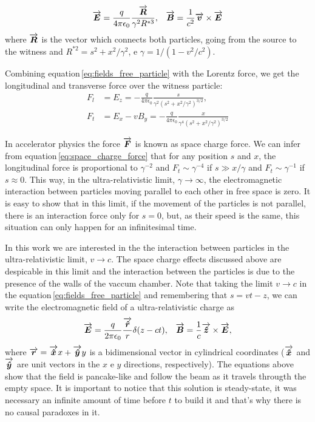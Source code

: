 \documentclass[
	12pt,				%
	openright,			%
	oneside,			%
	a4paper,		%
	chapter=TITLE,		%
	section=TITLE,		%
    brazil,				%
	english,			%
	sumario=tradicional,
	]{abntex2}
\begin{document}
\begin{apendicesenv}
\begin{align}\label{eq:fields_free_particle}
    \overrightarrow{\boldsymbol{E}} = \frac{q}{4\pi\epsilon_0}\frac{\overrightarrow{\boldsymbol{R}}}{\gamma^2 R^{*3}}, & & \overrightarrow{\boldsymbol{B}} = \frac{1}{c^2}\overrightarrow{\boldsymbol{v}} \times \overrightarrow{\boldsymbol{E}}
\end{align}
where $\overrightarrow{\boldsymbol{R}}$ is the vector which connects both particles, going from the source to the witness and  $R^{*2} = s^2 + x^2/\gamma^2$, e $\gamma = 1/(1-v^2/c^2)$.

Combining equation\,\ref{eq:fields_free_particle} with the Lorentz force, we get the longitudinal and transverse force over the witness particle:
\begin{align}\label{eq:space_charge_force}
    F_l &= E_z = -\frac{q}{4\pi\epsilon_0}\frac{s}{\gamma^2\left(s^2+x^2/\gamma^2\right)^{3/2}}, \\
    F_t &= E_x - vB_y = -\frac{q}{4\pi\epsilon_0}\frac{x}{\gamma^4\left(s^2+x^2/\gamma^2\right)^{3/2}}
\end{align}

In accelerator physics the force $\overrightarrow{\boldsymbol{F}}$ is known as space charge force. We can infer from equation\,\ref{eq:space_charge_force} that for any position $s$ and $x$, the longitudinal force is proportional to $\gamma^{-2}$ and $F_t \sim \gamma^{-4}$ if $s \gg x/\gamma$ and  $F_t \sim \gamma^{-1}$ if $s \approx 0$. This way, in the ultra-relativistic limit, $\gamma \to \infty$, the electromagnetic interaction between particles moving parallel to each other in free space is zero. It is easy to show that in this limit, if the movement of the particles is not parallel, there is an interaction force only for $s=0$, but, as their speed is the same, this situation can only happen for an infinitesimal time.

In this work we are interested in the the interaction between particles in the ultra-relativistic limit, $v \to c$. The space charge effects discussed above are despicable in this limit and the interaction between the particles is due to the presence of the walls of the vaccum chamber. Note that taking the limit $v \to c$ in the equation\,\ref{eq:fields_free_particle} and remembering that $s = vt - z$, we can write the electromagnetic field of a ultra-relativistic charge as
\begin{align}
    \overrightarrow{\boldsymbol{E}} = \frac{q}{2\pi\epsilon_0}\frac{\overrightarrow{\boldsymbol{\hat{r}}}}{r}\delta(z-ct), & & \overrightarrow{\boldsymbol{B}} =\frac{1}{c}\overrightarrow{\boldsymbol{\hat{z}}}\times\overrightarrow{\boldsymbol{E}},
\end{align}
where $\overrightarrow{\boldsymbol{r}} = \overrightarrow{\boldsymbol{\hat{x}}}x + \overrightarrow{\boldsymbol{\hat{y}}}y$ is a bidimensional vector in cylindrical coordinates ($\overrightarrow{\boldsymbol{\hat{x}}}$ and $\overrightarrow{\boldsymbol{\hat{y}}}$ are unit vectors in the $x$ e $y$ directions, respectively). The equations above show that the field is pancake-like and follow the beam as it travels througth the empty space. It is important to notice that this solution is steady-state, it was necessary an infinite amount of time before $t$ to build it and that's why there is no causal paradoxes in it.


\end{apendicesenv}
\end{document}
